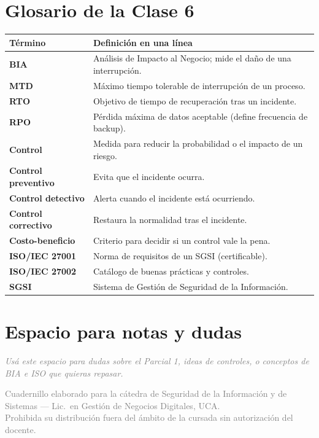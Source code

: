 \documentclass[12pt,a4paper]{article}
\renewcommand{\arraystretch}{1.25}
\begin{document}
\newpage
\section{Glosario de la Clase 6}

\renewcommand{\arraystretch}{1.4}
\begin{tabularx}{\textwidth}{>{\bfseries}p{4.5cm}X}
\toprule
\textbf{T\'ermino} & \textbf{Definici\'on en una l\'inea} \\
\midrule
BIA & An\'alisis de Impacto al Negocio; mide el da\~no de una interrupci\'on. \\
MTD & M\'aximo tiempo tolerable de interrupci\'on de un proceso. \\
RTO & Objetivo de tiempo de recuperaci\'on tras un incidente. \\
RPO & P\'erdida m\'axima de datos aceptable (define frecuencia de backup). \\
Control & Medida para reducir la probabilidad o el impacto de un riesgo. \\
Control preventivo & Evita que el incidente ocurra. \\
Control detectivo & Alerta cuando el incidente est\'a ocurriendo. \\
Control correctivo & Restaura la normalidad tras el incidente. \\
Costo-beneficio & Criterio para decidir si un control vale la pena. \\
ISO/IEC 27001 & Norma de requisitos de un SGSI (certificable). \\
ISO/IEC 27002 & Cat\'alogo de buenas pr\'acticas y controles. \\
SGSI & Sistema de Gesti\'on de Seguridad de la Informaci\'on. \\
\bottomrule
\end{tabularx}

\vspace{1cm}

\section{Espacio para notas y dudas}

\begin{tcolorbox}[colback=grisClaro, colframe=gray!50, arc=2mm, height=7cm]
\textcolor{gray}{\itshape Us\'a este espacio para dudas sobre el Parcial 1, ideas de controles, o conceptos de BIA e ISO que quieras repasar.}
\end{tcolorbox}

\vfill
\begin{center}
\small\textcolor{gray}{%
Cuadernillo elaborado para la c\'atedra de Seguridad de la Informaci\'on y de
Sistemas --- Lic.\ en Gesti\'on de Negocios Digitales, UCA.\\
Prohibida su distribuci\'on fuera del \'ambito de la cursada sin autorizaci\'on del docente.}
\end{center}
\end{document}
